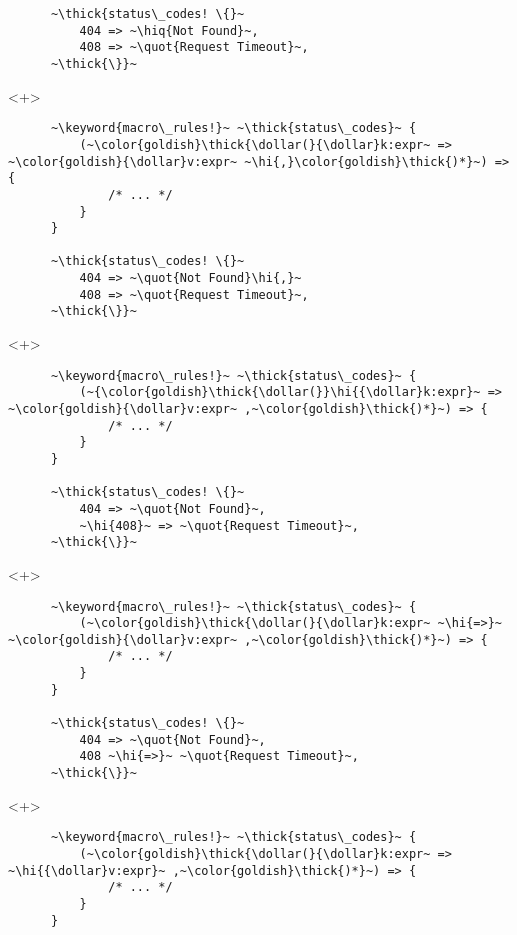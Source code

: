 \documentclass[usepdftitle=false]{beamer}
\newcommand{\dollar}{\makebox[\widthof{\$}][c]{\$}}
\newcommand{\thick}[1]{\contourlength{0.16pt}\contour[10]{black}{#1}}
\newcommand{\slantbox}[2][.5]
  {%
    \mbox
      {%
        \sbox{\foobox}{#2}%
        \hskip\wd\foobox
        \pdfsave
        \pdfsetmatrix{1 0 #1 1}%
        \llap{\usebox{\foobox}}%
        \pdfrestore
      }%
  }
\newcommand{\backslantbox}[2][.5]
  {%
    \mbox
      {%
        \sbox{\foobox}{#2}%
        \hskip\wd\foobox
        \pdfsave
        \pdfsetmatrix{-1 0 #1 1}%
        \llap{\usebox{\foobox}}%
        \pdfrestore
      }%
  }
\newcommand{\hi}[1]{%
\tikz[baseline=(A.base)]
 \node[highlighting=yellowbg,inner sep=0pt,text depth=0pt] (A) {#1};%
}
\newcommand{\openquote}{\backslantbox[.2]{\hspace{11pt}''\hspace{-11pt}}}
\newcommand{\closequote}{\slantbox[-.2]{\hspace{2pt}''\hspace{-2pt}}}
\newcommand{\hiq}[1]{\hi{\openquote#1\closequote}}
\newcommand{\blackquote}[1]{\openquote#1\closequote}
\newcommand{\quot}[1]{{\color{redish}\blackquote{#1}}}
\newcommand{\keyword}[1]{\color{greenish}#1}
\begin{document}
\begin{frame}[fragile]
\begin{onlyenv}
\begin{verbatim}
      ~\thick{status\_codes! \{}~
          404 => ~\hiq{Not Found}~,
          408 => ~\quot{Request Timeout}~,
      ~\thick{\}}~
    \end{verbatim}
  \end{onlyenv}
  \begin{onlyenv}<+>
    \begin{verbatim}
      ~\keyword{macro\_rules!}~ ~\thick{status\_codes}~ {
          (~\color{goldish}\thick{\dollar(}{\dollar}k:expr~ => ~\color{goldish}{\dollar}v:expr~ ~\hi{,}\color{goldish}\thick{)*}~) => {
              /* ... */
          }
      }

      ~\thick{status\_codes! \{}~
          404 => ~\quot{Not Found}\hi{,}~
          408 => ~\quot{Request Timeout}~,
      ~\thick{\}}~
    \end{verbatim}
  \end{onlyenv}
  \begin{onlyenv}<+>
    \begin{verbatim}
      ~\keyword{macro\_rules!}~ ~\thick{status\_codes}~ {
          (~{\color{goldish}\thick{\dollar(}}\hi{{\dollar}k:expr}~ => ~\color{goldish}{\dollar}v:expr~ ,~\color{goldish}\thick{)*}~) => {
              /* ... */
          }
      }

      ~\thick{status\_codes! \{}~
          404 => ~\quot{Not Found}~,
          ~\hi{408}~ => ~\quot{Request Timeout}~,
      ~\thick{\}}~
    \end{verbatim}
  \end{onlyenv}
  \begin{onlyenv}<+>
    \begin{verbatim}
      ~\keyword{macro\_rules!}~ ~\thick{status\_codes}~ {
          (~\color{goldish}\thick{\dollar(}{\dollar}k:expr~ ~\hi{=>}~ ~\color{goldish}{\dollar}v:expr~ ,~\color{goldish}\thick{)*}~) => {
              /* ... */
          }
      }

      ~\thick{status\_codes! \{}~
          404 => ~\quot{Not Found}~,
          408 ~\hi{=>}~ ~\quot{Request Timeout}~,
      ~\thick{\}}~
    \end{verbatim}
  \end{onlyenv}
  \begin{onlyenv}<+>
    \begin{verbatim}
      ~\keyword{macro\_rules!}~ ~\thick{status\_codes}~ {
          (~\color{goldish}\thick{\dollar(}{\dollar}k:expr~ => ~\hi{{\dollar}v:expr}~ ,~\color{goldish}\thick{)*}~) => {
              /* ... */
          }
      }


\end{verbatim}
\end{onlyenv}
\end{frame}
\end{document}
